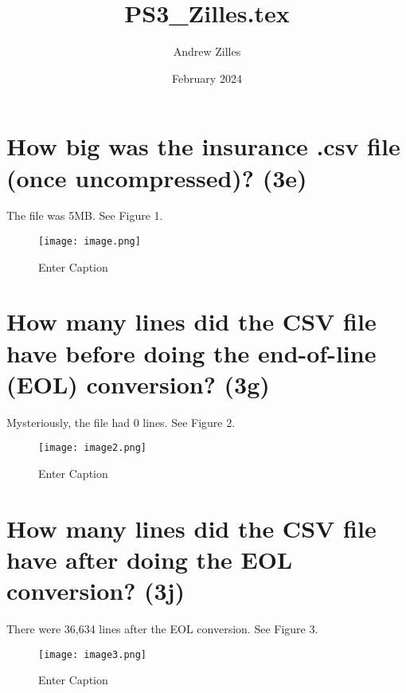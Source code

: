 \documentclass{article}
\title{PS3_Zilles.tex}
\author{Andrew Zilles}
\date{February 2024}
\begin{document}
\maketitle

\section{How big was the insurance .csv file (once uncompressed)? (3e)}
The file was 5MB. See Figure 1.
\begin{figure}
    \centering
    \texttt{[image: image.png]}
    \caption{Enter Caption}
    \label{fig:enter-label}
\end{figure}

\section{How many lines did the CSV file have before doing the end-of-line (EOL) conversion? (3g)}
Mysteriously, the file had 0 lines. See Figure 2.
\begin{figure}
    \centering
    \texttt{[image: image2.png]}
    \caption{Enter Caption}
    \label{fig:enter-label}
\end{figure}

\section{How many lines did the CSV file have after doing the EOL conversion? (3j)}
There were 36,634 lines after the EOL conversion. See Figure 3.
\begin{figure}
    \centering
    \texttt{[image: image3.png]}
    \caption{Enter Caption}
    \label{fig:enter-label}
\end{figure}
\end{document}
